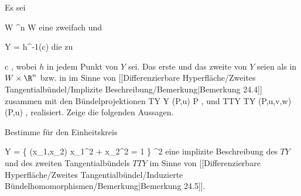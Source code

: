 {}
{

Es sei

\mavergleichskette
{\vergleichskette
{ W
}
{ \subseteq }{ \R^n
}
{  }{
}
{    }{
}
{   }{
}
}
{}{}{}
 { W } { \R
} {}
eine zweifach
und

\mavergleichskette
{\vergleichskette
{ Y
}
{ = }{ h^{-1}(c)
}
{  }{
}
{    }{
}
{   }{
}
}
{}{}{}
die
zu

\mavergleichskette
{\vergleichskette
{ c
}
{ \in }{ \R
}
{  }{
}
{    }{
}
{   }{
}
}
{}{}{,}
wobei $h$ in jedem Punkt von $Y$
sei. Das erste und das zweite
von $Y$ seien als
in $W \times \R^n$ bzw. in
 im Sinne von
[[Differenzierbare Hyperfläche/Zweites Tangentialbündel/Implizite Beschreibung/Bemerkung|Bemerkung 24.4]]
zusammen mit den Bündelprojektionen
\maabbeledisp {\pi} {TY} {Y
} {(P,u)} {P
} {,}
und
 {TTY} {TY
} {(P,u,v,w)} {(P,u)
} {,}
realisiert. Zeige die folgenden Aussagen.

}
{} {}

{}
{

Bestimme für den Einheitskreis

\mavergleichskettedisp
{\vergleichskette
{ Y
}
{ =} { \left\{ (x_1,x_2)  \mid   x_1^2 + x_2^2 = 1         \right\}
}
{ \subset} { \R^2
}
{ } {
}
{ } {
}
}
{}{}{}
eine implizite Beschreibung des
$TY$ und des zweiten Tangentialbündels $TTY$ im Sinne von
[[Differenzierbare Hyperfläche/Zweites Tangentialbündel/Induzierte Bündelhomomorphismen/Bemerkung|Bemerkung 24.5]].

}
{} {}

